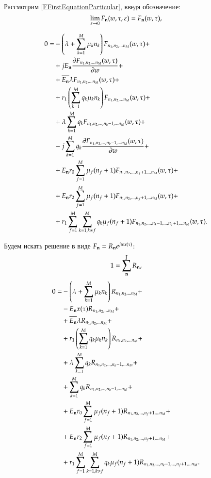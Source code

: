 Рассмотрим \eqref{FFirstEquationParticular}, введя обозначение:
\[\lim_{\varepsilon \to 0} {F}_{\bold{n}}(w, \tau, \varepsilon) =
    {F}_{\bold{n}}(w, \tau),\]

\begin{equation}\begin{aligned}
\label{FLimitEquationParticular}
0=
    &-\left( {\lambda+\sum_{{k}=1}^{M}\mu_{k}{n}_{k}} \right){F}_{{n}_1, {n}_2, ... {n}_{M}}(w,\tau)+\\
    &+j E_{\bold{n}} \pdv{ {F}_{{n}_1, {n}_2, ... {n}_{M}} (w,\tau)}{w}(i,\tau) + \\
    &+\overline{E_{\bold{n}}} \lambda {F}_{{n}_1, {n}_2, ... {n}_{M}}(w,\tau)+\\
    &+r_1 \left( {\sum_{{k}=1}^{M} q_{k}\mu_{k}{n}_{k}} \right) {F}_{{n}_1, {n}_2, ... {n}_{M}}(w,\tau) + \\
    &+\lambda\sum_{k=1}^{M}q_k {F}_{{n}_1, {n}_2, ... , {n}_{k} - 1, ... {n}_{M}}(w,\tau) + \\
    &-j\sum_{k=1}^{M}q_k \pdv{ {F}_{{n}_1, {n}_2, ... , {n}_{k} - 1, ... {n}_{M}} (w,\tau)}{w} + \\
    &+E_{\bold{n}} r_0 \sum_{f=1}^{M} \mu_f (n_f + 1) {F}_{{n}_1, {n}_2, ... , {n}_{f} + 1, ... {n}_{M}}(w,\tau) + \\
    &+E_{\bold{n}} r_2 \sum_{f=1}^{M} \mu_f (n_f + 1) {F}_{{n}_1, {n}_2, ... , {n}_{f} + 1, ... {n}_{M}}(w,\tau) + \\
    &+r_1 \sum_{{f}=1}^{M} \sum_{{k}=1, {k} \neq {f}}^{M}
        q_k \mu_f (n_f+1) {F}_{{n}_1, {n}_2, ... , {n}_{k} - 1, ... , {n}_{f} + 1, ... {n}_{M}}(w,\tau).
\end{aligned}\end{equation}

Будем искать решение в виде \({F}_{\bold{n}} = R_{\bold{n}} e^{jwx(\tau)}\):
\begin{equation} \label{RSumEqualsToOne}
    1 = \sum_{\bold{n}}^{\mathbb{J}}R_{\bold{n}},
\end{equation}
\begin{equation}\begin{aligned} \label{RFirstEverParticular}
0=
    &-\left( {\lambda+\sum_{{k}=1}^{M}\mu_{k}{n}_{k}} \right){R}_{{n}_1, {n}_2, ... {n}_{M}}+\\
    &-E_{\bold{n}} x(\tau) {R}_{{n}_1, {n}_2, ... {n}_{M}} + \\
    &+\overline{E_{\bold{n}}} \lambda {R}_{{n}_1, {n}_2, ... {n}_{M}} +\\
    &+r_1 \left( {\sum_{{k}=1}^{M} q_{k}\mu_{k}{n}_{k}} \right) {R}_{{n}_1, {n}_2, ... {n}_{M}} + \\
    &+\lambda\sum_{k=1}^{M}q_k {R}_{{n}_1, {n}_2, ... , {n}_{k} - 1, ... {n}_{M}} + \\
    &+\sum_{k=1}^{M}q_k {R}_{{n}_1, {n}_2, ... , {n}_{k} - 1, ... {n}_{M}} + \\
    &+E_{\bold{n}} r_0 \sum_{f=1}^{M} \mu_f (n_f + 1) {R}_{{n}_1, {n}_2, ... , {n}_{f} + 1, ... {n}_{M}} + \\
    &+E_{\bold{n}} r_2 \sum_{f=1}^{M} \mu_f (n_f + 1) {R}_{{n}_1, {n}_2, ... , {n}_{f} + 1, ... {n}_{M}} + \\
    &+r_1 \sum_{{f}=1}^{M} \sum_{{k}=1, {k} \neq {f}}^{M}
        q_k \mu_f (n_f+1) {R}_{{n}_1, {n}_2, ... , {n}_{k} - 1, ... , {n}_{f} + 1, ... {n}_{M}}.
\end{aligned}\end{equation}

